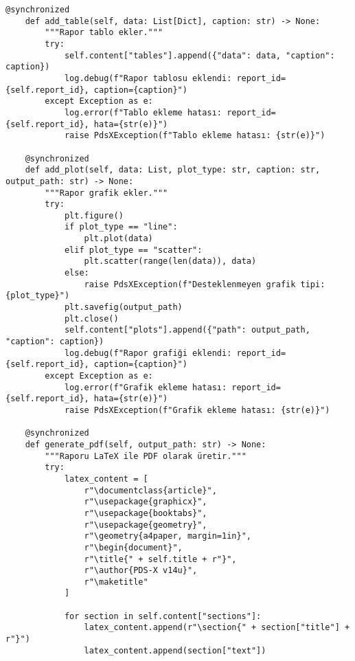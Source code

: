 \documentclass[a4paper,12pt]{article}
\begin{document}
\begin{lstlisting}[caption={export_report_doc.py Source Code}, label={lst:code}]
    @synchronized
    def add_table(self, data: List[Dict], caption: str) -> None:
        """Rapor tablo ekler."""
        try:
            self.content["tables"].append({"data": data, "caption": caption})
            log.debug(f"Rapor tablosu eklendi: report_id={self.report_id}, caption={caption}")
        except Exception as e:
            log.error(f"Tablo ekleme hatası: report_id={self.report_id}, hata={str(e)}")
            raise PdsXException(f"Tablo ekleme hatası: {str(e)}")

    @synchronized
    def add_plot(self, data: List, plot_type: str, caption: str, output_path: str) -> None:
        """Rapor grafik ekler."""
        try:
            plt.figure()
            if plot_type == "line":
                plt.plot(data)
            elif plot_type == "scatter":
                plt.scatter(range(len(data)), data)
            else:
                raise PdsXException(f"Desteklenmeyen grafik tipi: {plot_type}")
            plt.savefig(output_path)
            plt.close()
            self.content["plots"].append({"path": output_path, "caption": caption})
            log.debug(f"Rapor grafiği eklendi: report_id={self.report_id}, caption={caption}")
        except Exception as e:
            log.error(f"Grafik ekleme hatası: report_id={self.report_id}, hata={str(e)}")
            raise PdsXException(f"Grafik ekleme hatası: {str(e)}")

    @synchronized
    def generate_pdf(self, output_path: str) -> None:
        """Raporu LaTeX ile PDF olarak üretir."""
        try:
            latex_content = [
                r"\documentclass{article}",
                r"\usepackage{graphicx}",
                r"\usepackage{booktabs}",
                r"\usepackage{geometry}",
                r"\geometry{a4paper, margin=1in}",
                r"\begin{document}",
                r"\title{" + self.title + r"}",
                r"\author{PDS-X v14u}",
                r"\maketitle"
            ]
            
            for section in self.content["sections"]:
                latex_content.append(r"\section{" + section["title"] + r"}")
                latex_content.append(section["text"])
            

\end{lstlisting}
\end{document}
